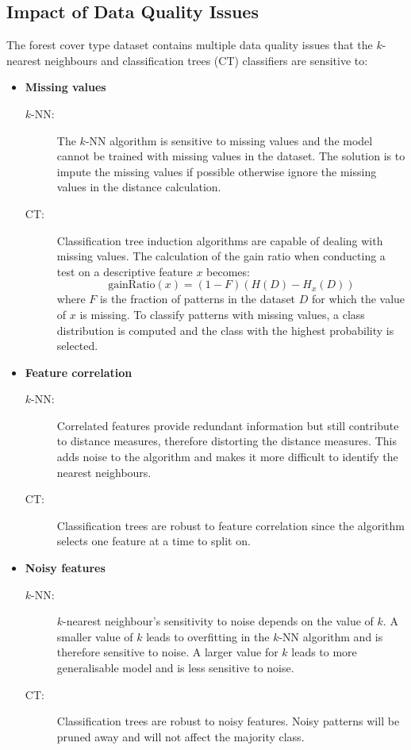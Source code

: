 \documentclass[conference]{IEEEtran}
\begin{document}
	\subsection{Impact of Data Quality Issues}
	The forest cover type dataset contains multiple data quality issues that the $k$-nearest neighbours and classification trees (CT) classifiers are sensitive to:
	\begin{itemize}
		\item \textbf{Missing values}  
		\begin{description}
			\item [$k$-NN:] The $k$-NN algorithm is sensitive to missing values and the model cannot be trained with missing values in the dataset. The solution is to impute the missing values if possible otherwise ignore the missing values in the distance calculation.
			\item [CT:] Classification tree induction algorithms are capable of dealing with missing values. The calculation of the gain ratio when conducting a test on a descriptive feature $x$ becomes:
			$$
			\text{gainRatio}(x) = (1 - F)(H(D) - H_x(D))
			$$ 
			where $F$ is the fraction of patterns in the dataset $D$ for which the value of $x$ is missing. To classify patterns with missing values, a class distribution is computed and the class with the highest probability is selected.
		\end{description}
		
		\item \textbf{Feature correlation}  
		\begin{description}
			\item [$k$-NN:] Correlated features provide redundant information but still contribute to distance measures, therefore distorting the distance measures. This adds noise to the algorithm and makes it more difficult to identify the nearest neighbours.
			\item [CT:] Classification trees are robust to feature correlation since the algorithm selects one feature at a time to split on.
		\end{description}
		
		\item \textbf{Noisy features}  
		\begin{description}
			\item [$k$-NN:] $k$-nearest neighbour's sensitivity to noise depends on the value of $k$. A smaller value of $k$ leads to overfitting in the $k$-NN algorithm and is therefore sensitive to noise. A larger value for $k$ leads to more generalisable model and is less sensitive to noise.
			\item [CT:] Classification trees are robust to noisy features. Noisy patterns will be pruned away and will not affect the majority class.
		\end{description}
		

\end{itemize}
\end{document}
